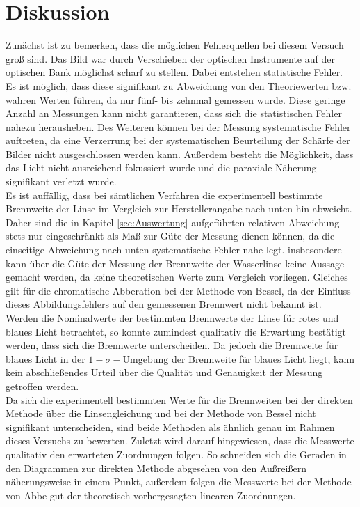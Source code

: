\section{Diskussion}
\label{sec:Diskussion}
Zunächst ist zu bemerken, dass die möglichen Fehlerquellen bei diesem Versuch groß sind.
Das Bild war durch Verschieben der optischen Instrumente auf der optischen Bank möglichst
scharf zu stellen. Dabei entstehen statistische Fehler. Es ist möglich, dass diese
signifikant zu Abweichung von den Theoriewerten bzw. wahren Werten führen, da nur fünf-
bis zehnmal gemessen wurde. Diese geringe Anzahl an Messungen kann nicht
garantieren, dass sich die statistischen Fehler nahezu herausheben. Des Weiteren können
bei der Messung systematische Fehler auftreten, da eine Verzerrung bei der systematischen
Beurteilung der Schärfe der Bilder nicht ausgeschlossen werden kann. Außerdem besteht die
Möglichkeit, dass das Licht nicht ausreichend fokussiert wurde und die paraxiale Näherung
signifikant verletzt wurde.\\
Es ist auffällig, dass bei sämtlichen Verfahren die experimentell bestimmte Brennweite der Linse im Vergleich
zur Herstellerangabe nach unten hin abweicht. Daher sind die in Kapitel \ref{sec:Auswertung}
aufgeführten relativen Abweichung stets nur eingeschränkt als Maß zur Güte der Messung
dienen können, da die einseitige Abweichung nach unten systematische Fehler nahe legt.
insbesondere kann über die Güte der Messung der Brennweite der Wasserlinse keine
Aussage gemacht werden, da keine theoretischen Werte zum Vergleich vorliegen.
Gleiches gilt für die chromatische Abberation bei der Methode von Bessel, da der Einfluss
dieses Abbildungsfehlers auf den gemessenen Brennwert nicht bekannt ist. Werden
die Nominalwerte der bestimmten Brennwerte der Linse für rotes und blaues Licht betrachtet,
so konnte zumindest qualitativ die Erwartung bestätigt werden, dass sich die Brennwerte
unterscheiden. Da jedoch die Brennweite für blaues Licht in der $1-\sigma-\text{Umgebung}$
der Brennweite für blaues Licht liegt, kann kein abschließendes Urteil über die
Qualität und Genauigkeit der Messung getroffen werden. \\
Da sich die experimentell bestimmten Werte für die Brennweiten bei der direkten Methode
über die Linsengleichung und bei der Methode von Bessel nicht signifikant unterscheiden,
sind beide Methoden als ähnlich genau im Rahmen dieses Versuchs zu bewerten.
Zuletzt wird darauf hingewiesen, dass die Messwerte qualitativ den erwarteten Zuordnungen
folgen. So schneiden sich die Geraden in den Diagrammen zur direkten Methode abgesehen
von den Außreißern näherungsweise in einem Punkt, außerdem folgen die Messwerte bei der
Methode von Abbe gut der theoretisch vorhergesagten linearen Zuordnungen.
